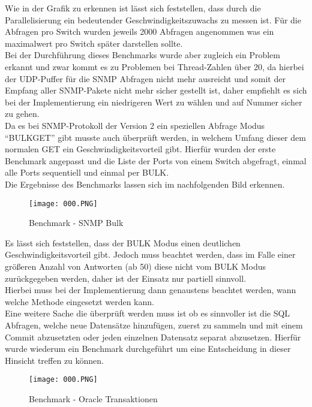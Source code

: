 Wie in der Grafik zu erkennen ist lässt sich feststellen, dass durch die Parallelisierung ein bedeutender Geschwindigkeitszuwachs zu messen ist.
Für die Abfragen pro Switch wurden jeweils 2000 Abfragen angenommen was ein maximalwert pro Switch später darstellen sollte.\\
Bei der Durchführung dieses Benchmarks wurde aber zugleich ein Problem erkannt und zwar kommt es zu Problemen bei Thread-Zahlen über 20, da hierbei der UDP-Puffer für die SNMP Abfragen nicht mehr ausreicht und somit der Empfang aller SNMP-Pakete nicht mehr sicher gestellt ist, daher empfiehlt es sich bei der Implementierung ein niedrigeren Wert zu wählen und auf Nummer sicher zu gehen.\\
Da es bei SNMP-Protokoll der Version 2 ein speziellen Abfrage Modus “BULKGET” gibt musste auch überprüft werden, in welchem Umfang dieser dem normalen GET ein Geschwindigkeitsvorteil gibt. Hierfür wurden der erste Benchmark angepasst und die Liste der Ports von einem Switch abgefragt, einmal alle Ports sequentiell und einmal per BULK.\\
Die Ergebnisse des Benchmarks lassen sich im nachfolgenden Bild erkennen.\\

\begin{figure}[H]
\centering
\texttt{[image: 000.PNG]}
\caption{Benchmark - SNMP Bulk}
\label{fig:benchsnmpbulk}
\end{figure}

Es lässt sich feststellen, dass der BULK Modus einen deutlichen Geschwindigkeitsvorteil gibt. Jedoch muss beachtet werden, dass im Falle einer größeren Anzahl von Antworten (ab 50) diese nicht vom BULK Modus zurückgegeben werden, daher ist der Einsatz nur partiell sinnvoll.\\
Hierbei muss bei der Implementierung dann genaustens beachtet werden, wann welche Methode eingesetzt werden kann.\\

Eine weitere Sache die überprüft werden muss ist ob es sinnvoller ist die SQL Abfragen, welche neue Datensätze hinzufügen, zuerst zu sammeln und mit einem Commit abzusetzten oder jeden einzelnen Datensatz separat abzusetzen. Hierfür wurde wiederum ein Benchmark durchgeführt um eine Entscheidung in dieser Hinsicht treffen zu können.\\

\begin{figure}[H]
\centering
\texttt{[image: 000.PNG]}
\caption{Benchmark - Oracle Transaktionen}
\label{fig:benchoracletransactions}
\end{figure}

